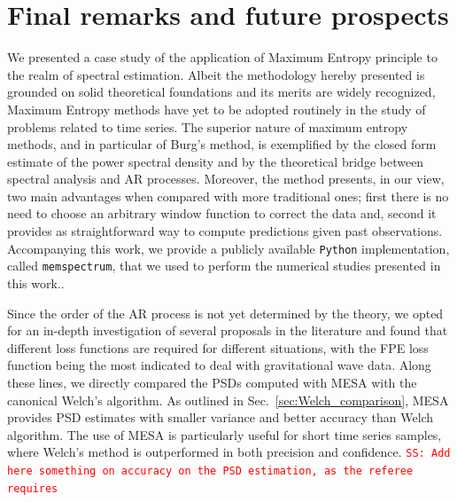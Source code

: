 \documentclass[twocolumn,showpacs,preprintnumbers,nofootinbib,prd,
superscriptaddress,10pt]{revtex4-1}
\newcommand{\sschmidt}[1]{{\textcolor{red}{\texttt{SS: #1}} }}
\begin{document}
\section{Final remarks and future prospects} \label{sec:conclusion}
We presented a case study of the application of Maximum Entropy principle to the realm of spectral estimation. Albeit the methodology hereby presented is grounded on solid theoretical foundations and its merits are widely recognized, Maximum Entropy methods have yet to be adopted routinely in the study of problems related to time series. The superior nature of maximum entropy methods, and in particular of Burg's method, is exemplified by the closed form estimate of the power spectral density and by the theoretical bridge between spectral analysis and AR processes. Moreover, the method presents, in our view, two main advantages when compared with more traditional ones; first there is no need to choose an arbitrary window function to correct the data and, second it provides as straightforward way to compute predictions given past observations. Accompanying this work, we provide a publicly available \texttt{Python} implementation, called \texttt{memspectrum}, that we used to perform the numerical studies presented in this work.. 

Since the order of the AR process is not yet determined by the theory, we opted for an in-depth investigation of several proposals in the literature and found that different loss functions are required for different situations, with the FPE loss function being the most indicated to deal with gravitational wave data. Along these lines, we directly compared the PSDs computed with MESA with the canonical Welch's algorithm. As outlined in Sec.~\ref{sec:Welch_comparison}, MESA provides PSD estimates with smaller variance and better accuracy than Welch algorithm. The use of MESA is particularly useful for short time series samples, where Welch's method is outperformed in both precision and confidence. \sschmidt{Add here something on accuracy on the PSD estimation, as the referee requires}
 
\end{document}
